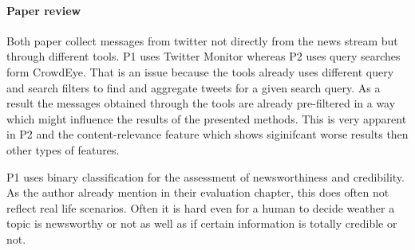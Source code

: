 \documentclass{proseminar}
\begin{document}

\paragraph{Paper review}
Both paper collect messages from twitter not directly from the news stream but through different tools. P1 uses Twitter Monitor whereas P2 uses query searches form CrowdEye.
That is an issue because the tools already uses different query and search filters to find and aggregate tweets for a given search query. As a result the messages obtained through the tools are already pre-filtered in a way which might influence the results of the presented methods.
This is very apparent in P2 and the content-relevance feature which shows siginifcant worse results then other types of features. 

P1 uses binary classification for the assessment of newsworthiness and credibility. As the author already mention in their evaluation chapter, this does often not reflect real life scenarios. Often it is hard even for a human to decide weather a topic is newsworthy or not as well as if certain information is totally credible or not.























 

\balancecolumns
\end{document}
